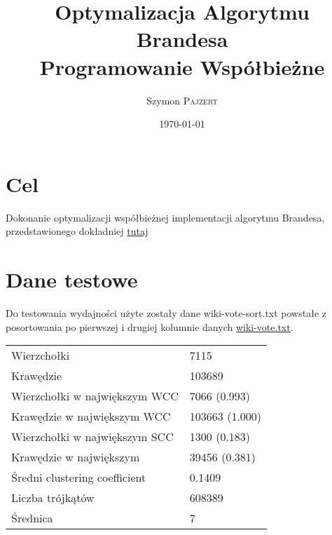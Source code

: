 \documentclass{article}
\title{Optymalizacja Algorytmu Brandesa \\ Programowanie Współbieżne } %
\author{Szymon \textsc{Pajzert}} %
\date{\today} %
\begin{document}
\maketitle %



\section*{Cel}

Dokonanie optymalizacji współbieżnej implementacji algorytmu Brandesa, przedstawionego dokładniej \href{http://www.algo.uni-konstanz.de/publications/b-fabc-01.pdf}{tutaj}
 

\section*{Dane testowe}
Do testowania wydajności użyte zostały dane wiki-vote-sort.txt powstałe z posortowania po pierwszej i drugiej kolumnie danych \href{http://snap.stanford.edu/data/wiki-Vote.html}{wiki-vote.txt}. \\

\begin{tabular}{ll}
Wierzchołki & 7115 \\
Krawędzie & 103689 \\
Wierzchołki w największym WCC & 7066 (0.993) \\
Krawędzie w największym WCC & 103663 (1.000) \\
Wierzchołki w największym SCC & 1300 (0.183) \\ 
Krawędzie w największym & 39456 (0.381) \\
Średni clustering coefficient & 0.1409 \\
Liczba trójkątów & 608389 \\
Średnica & 7
\end{tabular}
\end{document}
